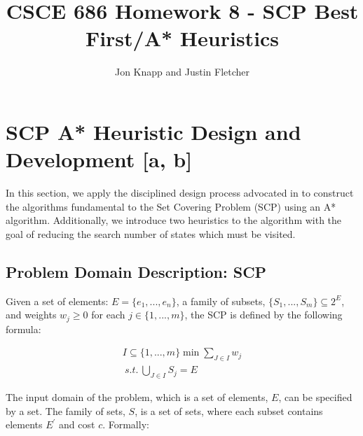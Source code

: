 \documentclass[12pt]{article}
\begin{document}
	
	\title{CSCE 686 Homework 8 - SCP Best First/A* Heuristics}
	\author{Jon Knapp and Justin Fletcher}
	\maketitle
	
	\section{SCP A* Heuristic Design and Development [a, b]} \label{scn:design}
	
	In this section, we apply the disciplined design process advocated in \cite{ClassNotes686} to construct the algorithms fundamental to the Set Covering Problem (SCP) using an A* algorithm. Additionally, we introduce two heuristics to the algorithm with the goal of reducing the search number of states which must be visited.
	
	\subsection{Problem Domain Description: SCP}
	Given a set of elements: $E=\{e_1,...,e_n\}$, a family of subsets, $\{S_1,...,S_m\}\subseteq 2^E$, and weights $w_j \geq 0$ for each $j\in\{1,...,m\}$, the SCP is defined by the following formula:
	
	\begin{align*}
	I \subseteq \{1,...,m\} \min \sum_{J \in I} w_j \\
	\:s.t.\: \bigcup_{J \in I} S_j = E
	\end{align*}
	
	
	The input domain of the problem, which is a set of elements, $E$, can be specified by a set. The family of sets, $S$, is a set of sets, where each subset contains elements $E^\prime$ and cost $c$. Formally:
	
\end{document}
